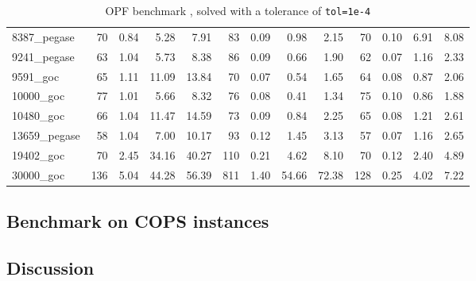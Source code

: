 \begin{table}[!ht]
{\begin{tabular}{|l|rrrr|rrrr|rrrr|}
			8387\_pegase & 70 & 0.84 & 5.28 & 7.91 & 83 & 0.09 & 0.98 & 2.15 & 70 & 0.10 & 6.91 & 8.08 \\
			9241\_pegase & 63 & 1.04 & 5.73 & 8.38 & 86 & 0.09 & 0.66 & 1.90 & 62 & 0.07 & 1.16 & 2.33 \\
			9591\_goc & 65 & 1.11 & 11.09 & 13.84 & 70 & 0.07 & 0.54 & 1.65 & 64 & 0.08 & 0.87 & 2.06 \\
			10000\_goc & 77 & 1.01 & 5.66 & 8.32 & 76 & 0.08 & 0.41 & 1.34 & 75 & 0.10 & 0.86 & 1.88 \\
			\hline
			10480\_goc & 66 & 1.04 & 11.47 & 14.59 & 73 & 0.09 & 0.84 & 2.25 & 65 & 0.08 & 1.21 & 2.61 \\
			13659\_pegase & 58 & 1.04 & 7.00 & 10.17 & 93 & 0.12 & 1.45 & 3.13 & 57 & 0.07 & 1.16 & 2.65 \\
			19402\_goc & 70 & 2.45 & 34.16 & 40.27 & 110 & 0.21 & 4.62 & 8.10 & 70 & 0.12 & 2.40 & 4.89 \\
			30000\_goc & 136 & 5.04 & 44.28 & 56.39 & 811 & 1.40 & 54.66 & 72.38 & 128 & 0.25 & 4.02 & 7.22 \\
			\hline
		\end{tabular}
  }
  \caption{OPF benchmark \label{tab:opf:benchmark}, solved with a tolerance of {\tt tol=1e-4}}
\end{table}


\subsection{Benchmark on COPS instances}

\subsection{Discussion}


